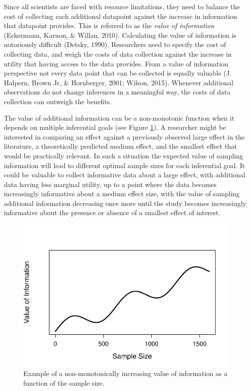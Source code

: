 \documentclass[
  english,
  ,jou, a4paper,floatsintext]{apa6}
\begin{document}
Since all scientists are faced with resource limitations, they need to balance the cost of collecting each additional datapoint against the increase in information that datapoint provides. This is referred to as the \emph{value of information} (Eckermann, Karnon, \& Willan, 2010). Calculating the value of information is notoriously difficult (Detsky, 1990). Researchers need to specify the cost of collecting data, and weigh the costs of data collection against the increase in utility that having access to the data provides. From a value of information perspective not every data point that can be collected is equally valuable (J. Halpern, Brown Jr, \& Hornberger, 2001; Wilson, 2015). Whenever additional observations do not change inferences in a meaningful way, the costs of data collection can outweigh the benefits.

The value of additional information can be a non-monotonic function when it depends on multiple inferential goals (see Figure \ref{fig:non-monotonic}). A researcher might be interested in comparing an effect against a previously observed large effect in the literature, a theoretically predicted medium effect, and the smallest effect that would be practically relevant. In such a situation the expected value of sampling information will lead to different optimal sample sizes for each inferential goal. It could be valuable to collect informative data about a large effect, with additional data having less marginal utility, up to a point where the data becomes increasingly informative about a medium effect size, with the value of sampling additional information decreasing once more until the study becomes increasingly informative about the presence or absence of a smallest effect of interest.

\begin{figure}
\centering
\includegraphics{sample_size_justification_files/figure-latex/non-monotonic-1.pdf}
\caption{\label{fig:non-monotonic}Example of a non-monotonically increasing value of information as a function of the sample size.}
\end{figure}
\end{document}
